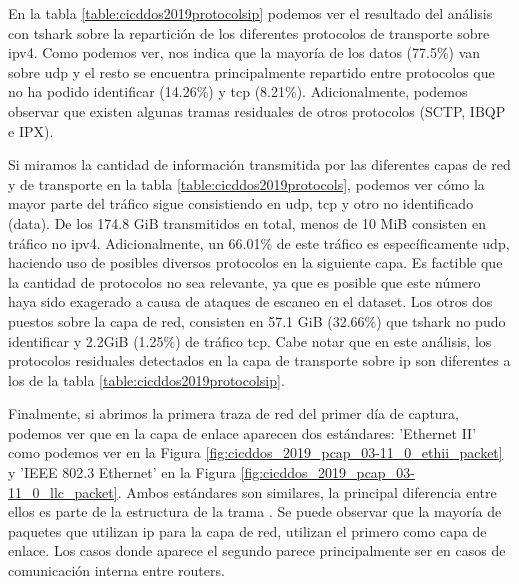 En la tabla \ref{table:cicddos2019protocolsip} podemos ver el resultado del análisis con tshark sobre la repartición de los diferentes protocolos de transporte sobre \acrshort{ipv4}. Como podemos ver, nos indica que la mayoría de los datos (77.5\%) van sobre \acrshort{udp} y el resto se encuentra principalmente repartido entre protocolos que no ha podido identificar (14.26\%) y \acrshort{tcp} (8.21\%). Adicionalmente, podemos observar que existen algunas tramas residuales de otros protocolos (SCTP, IBQP e IPX).



Si miramos la cantidad de información transmitida por las diferentes capas de red y de transporte en la tabla \ref{table:cicddos2019protocols}, podemos ver cómo la mayor parte del tráfico sigue consistiendo en \acrshort{udp}, \acrshort{tcp} y otro no identificado (data). De los 174.8 GiB transmitidos en total, menos de 10 MiB consisten en tráfico no \acrshort{ipv4}. Adicionalmente, un 66.01\% de este tráfico es específicamente \acrshort{udp}, haciendo uso de posibles diversos protocolos en la siguiente capa. Es factible que la cantidad de protocolos no sea relevante, ya que es posible que este número haya sido exagerado a causa de ataques de escaneo en el dataset. Los otros dos puestos sobre la capa de red, consisten en 57.1 GiB (32.66\%) que tshark no pudo identificar y 2.2GiB (1.25\%) de tráfico \acrshort{tcp}. Cabe notar que en este análisis, los protocolos residuales detectados en la capa de transporte sobre \acrshort{ip} son diferentes a los de la tabla \ref{table:cicddos2019protocolsip}.



Finalmente, si abrimos la primera traza de red del primer día de captura, podemos ver que en la capa de enlace aparecen dos estándares: 'Ethernet II' como podemos ver en la Figura \ref{fig:cicddos_2019_pcap_03-11_0_ethii_packet} y 'IEEE 802.3 Ethernet' en la Figura \ref{fig:cicddos_2019_pcap_03-11_0_llc_packet}. Ambos estándares son similares, la principal diferencia entre ellos es parte de la estructura de la trama \cite{IBMeth2vsllc}. Se puede observar que la mayoría de paquetes que utilizan \acrshort{ip} para la capa de red, utilizan el primero como capa de enlace. Los casos donde aparece el segundo parece principalmente ser en casos de comunicación interna entre routers.

